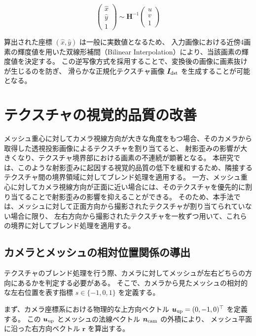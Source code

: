 \begin{equation}
  \begin{pmatrix} \hat{x} \\ \hat{y} \\ 1 \end{pmatrix} \sim \bm{H}^{-1} \begin{pmatrix} u \\ v \\ 1 \end{pmatrix}
\end{equation}

算出された座標 $(\hat{x}, \hat{y})$ は一般に実数値となるため、
入力画像における近傍4画素の輝度値を用いた双線形補間（Bilinear Interpolation）により、当該画素の輝度値を決定する。
この逆写像方式を採用することで、変換後の画像に画素抜けが生じるのを防ぎ、
滑らかな正規化テクスチャ画像 $\bm{I}_{\rm dst}$ を生成することが可能となる。


\section{テクスチャの視覚的品質の改善}

メッシュ重心に対してカメラ視線方向が大きな角度をもつ場合、そのカメラから取得した透視投影画像によるテクスチャを割り当てると、
射影歪みの影響が大きくなり、テクスチャ境界部における画素の不連続が顕著となる。
本研究では、このような射影歪みに起因する視覚的品質の低下を緩和するため、隣接するテクスチャ間の境界領域に対してブレンド処理を適用する。
一方、メッシュ重心に対してカメラ視線方向が正面に近い場合には、そのテクスチャを優先的に割り当てることで射影歪みの影響を抑えることができる。
そのため、本手法では、メッシュに対して正面方向から撮影されたテクスチャが割り当てられていない場合に限り、
左右方向から撮影されたテクスチャを一枚ずつ用いて、これらの境界に対してブレンド処理を適用する。

\subsection{カメラとメッシュの相対位置関係の導出}

テクスチャのブレンド処理を行う際、カメラに対してメッシュが左右どちらの方向にあるかを判定する必要がある。
そこで、カメラから見たメッシュの相対的な左右位置を表す指標 $s \in \{-1, 0, 1\}$ を定義する。

まず、カメラ座標系における物理的な上方向ベクトル $\bm{u}_{\rm up} = (0, -1, 0)^\top$ を定義する。
この $\bm{u}_{\rm up}$ とメッシュの法線ベクトル $\bm{n}_{\rm cam}$ の外積により、
メッシュ平面に沿った右方向ベクトル $\bm{r}$ を算出する。

